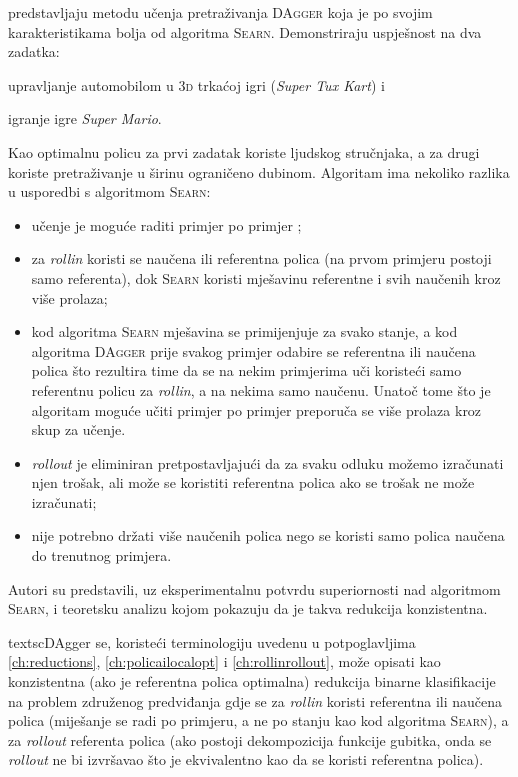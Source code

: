 \citet{ross2011reduction} predstavljaju metodu učenja pretraživanja
\textsc{DAgger}  koja je po svojim
karakteristikama bolja od algoritma \textsc{Searn}. Demonstriraju uspješnost na
dva zadatka:
\begin{inlinelist}
  \item upravljanje automobilom u \textsc{3d} trkaćoj igri (\textit{Super Tux
  Kart}) i
  \item igranje igre \textit{Super Mario}.
\end{inlinelist}
Kao optimalnu policu za prvi zadatak koriste ljudskog stručnjaka, a za drugi
koriste pretraživanje u širinu  ograničeno
dubinom. Algoritam ima nekoliko razlika u usporedbi s algoritmom \textsc{Searn}:
\begin{itemize}
  \item učenje je moguće raditi primjer po primjer ;
  \item za \textit{rollin} koristi se naučena ili referentna polica (na prvom
  primjeru postoji samo referenta), dok \textsc{Searn} koristi mješavinu
  referentne i svih naučenih kroz više prolaza;
  \item kod algoritma \textsc{Searn} mješavina se primijenjuje za svako stanje,
  a kod algoritma \textsc{DAgger} prije svakog primjer odabire se referentna ili
  naučena polica što rezultira time da se na nekim primjerima uči koristeći samo
  referentnu policu za \textit{rollin}, a na nekima samo naučenu. Unatoč tome
  što je algoritam moguće učiti primjer po primjer preporuča se više prolaza
  kroz skup za učenje.
  \item \textit{rollout} je eliminiran pretpostavljajući da za svaku odluku
  možemo izračunati njen trošak, ali može se koristiti referentna polica ako se
  trošak ne može izračunati;
  \item nije potrebno držati više naučenih polica nego se koristi samo polica
  naučena do trenutnog primjera.
\end{itemize}
Autori su predstavili, uz eksperimentalnu potvrdu superiornosti nad algoritmom
\textsc{Searn}, i teoretsku analizu kojom pokazuju da je takva redukcija
konzistentna.

textsc{DAgger} se, koristeći terminologiju uvedenu u potpoglavljima
\ref{ch:reductions}, \ref{ch:policailocalopt} i \ref{ch:rollinrollout}, može
opisati kao konzistentna (ako je referentna polica optimalna) redukcija binarne
klasifikacije na problem združenog predviđanja gdje se za \textit{rollin}
koristi referentna ili naučena polica (miješanje se radi po primjeru, a ne po
stanju kao kod algoritma \textsc{Searn}), a za \textit{rollout} referenta polica
(ako postoji dekompozicija funkcije gubitka, onda se \textit{rollout} ne bi
izvršavao što je ekvivalentno kao da se koristi referentna polica).
